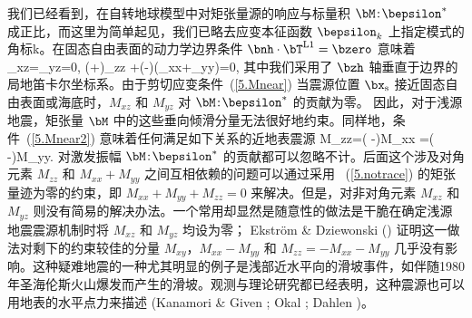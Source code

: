 我们已经看到，在自转地球模型中对矩张量源的响应与标量积
$\bM\!:\!\bepsilon^*$ 成正比，而这里为简单起见，我们已略去应变本征函数  $\bepsilon_k$ 上指定模式的角标k。在固态自由表面的动力学边界条件
$\bnh\cdot\bT^{\rm L1}=\bzero$ 意味着
\eq
\label{5.Mnear}
\varepsilon_{xz}=\varepsilon_{yz}=0,
\en
\eq
\label{5.Mnear2}
(\kappa+\fourthirds\mu)\varepsilon_{zz}
+(\kappa-\twothirds\mu)(\varepsilon_{xx}+\varepsilon_{yy})=0,
\en
其中我们采用了 $\bzh$ 轴垂直于边界的局地笛卡尔坐标系。由于剪切应变条件~(\ref{5.Mnear}) 当震源位置 $\bx_{\rm s}$ 接近固态自由表面或海底时，$M_{xz}$ 和 $M_{yz}$ 对 $\bM\!:\!\bepsilon^*$ 的贡献为零。
因此，对于浅源地震，矩张量 $\bM$ 中的这些垂向倾滑分量无法很好地约束。同样地，条件~(\ref{5.Mnear2}) 意味着任何满足如下关系的近地表震源
\eq
M_{zz}=\left(\frac{\kappa+\fourthirds\mu}
{\kappa-\twothirds\mu}\right)M_{xx}
=\left(\frac{\kappa+\fourthirds\mu}
{\kappa-\twothirds\mu}\right)M_{yy}.
\en
对激发振幅 $\bM\!:\!\bepsilon^*$ 的贡献都可以忽略不计。后面这个涉及对角元素
$M_{zz}$ 和 $M_{xx}+M_{yy}$ 之间互相依赖的问题可以通过采用
~(\ref{5.notrace}) 的矩张量迹为零的约束，即 $M_{xx}+M_{yy}+M_{zz}=0$ 来解决。但是，对非对角元素 $M_{xz}$ 和 $M_{yz}$ 则没有简易的解决办法。一个常用却显然是随意性的做法是干脆在确定浅源地震震源机制时将 $M_{xz}$ 和 $M_{yz}$ 均设为零；
Ekstr\"{o}m \& Dziewonski (\citeyear{ekstrom&dziewonski85})
证明这一做法对剩下的约束较佳的分量 $M_{xy}$，$M_{xx}-M_{yy}$
和 $M_{zz}=-M_{xx}-M_{yy}$ 几乎没有影响。这种疑难地震的一种尤其明显的例子是浅部近水平向的滑坡事件，如伴随1980年圣海伦斯火山爆发而产生的滑坡。观测与理论研究都已经表明，这种震源也可以用地表的水平点力来描述 (Kanamori \& Given
\citeyear{kanamori&given82}; Okal \citeyear{okal90};
Dahlen \citeyear{dahlen93})。

